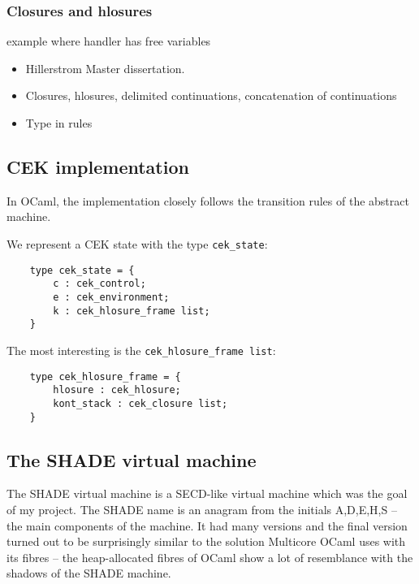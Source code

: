 \documentclass[class=article, crop=false]{standalone}
\begin{document}
\subsubsection{Closures and hlosures}

example where handler has free variables

\begin{itemize}
    \item Hillerstrom Master dissertation.
    \item Closures, hlosures, delimited continuations, concatenation of continuations
\end{itemize}

\begin{itemize}
    \item Type in rules
\end{itemize}

\subsection{CEK implementation}

In OCaml, the implementation closely follows the transition rules of the abstract machine.

We represent a CEK state with the type \verb|cek_state|:
\begin{verbatim}
    type cek_state = {
        c : cek_control;
        e : cek_environment;
        k : cek_hlosure_frame list;
    }
\end{verbatim}

The most interesting is the \verb|cek_hlosure_frame list|:
\begin{verbatim}
    type cek_hlosure_frame = {
        hlosure : cek_hlosure;
        kont_stack : cek_closure list;
    }
\end{verbatim}

\subsection{The SHADE virtual machine}

The SHADE virtual machine is a SECD-like virtual machine which was the goal of
my project.
The SHADE name is an anagram from the initials A,D,E,H,S -- the main
components of the machine.
It had many versions and the final version turned out to be surprisingly similar
to the solution Multicore OCaml uses with its fibres -- the heap-allocated fibres
of OCaml show a lot of resemblance with the shadows of the SHADE machine.
\end{document}
